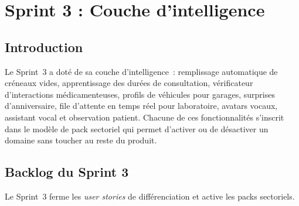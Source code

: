 \chapter{Sprint 3 : Couche d'intelligence}

\section{Introduction}
Le Sprint~3 a doté \nova{} de sa couche d'intelligence~:
remplissage automatique de créneaux vides, apprentissage des
durées de consultation, vérificateur d'interactions
médicamenteuses, profils de véhicules pour garages, surprises
d'anniversaire, file d'attente en temps réel pour laboratoire,
avatars vocaux, assistant vocal et observation patient. Chacune
de ces fonctionnalités s'inscrit dans le modèle de pack sectoriel
qui permet d'activer ou de désactiver un domaine sans toucher au
reste du produit.

\section{Backlog du Sprint 3}
Le Sprint~3 ferme les \emph{user stories} de différenciation et
active les packs sectoriels.

